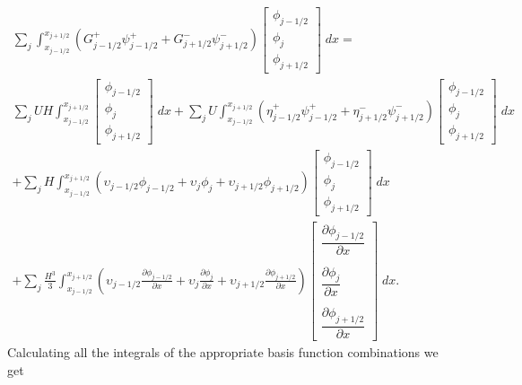 \begin{multline*}
\sum_j \int_{x_{j-1/2}}^{x_{j + 1/2}} \left(G^+_{j-1/2}\psi^+_{j - 1/2} + G^-_{j+1/2}\psi^-_{j + 1/2}\right) \begin{bmatrix}
\phi_{j-1/2}\\\phi_j \\\phi_{j+1/2}
\end{bmatrix}  \; dx =  \\ \sum_j UH\int_{x_{j-1/2}}^{x_{j + 1/2}}  \begin{bmatrix}
\phi_{j-1/2}\\\phi_j \\\phi_{j+1/2}
\end{bmatrix}  \; dx + \sum_j U\int_{x_{j-1/2}}^{x_{j + 1/2}} \left(\eta^+_{j-1/2}\psi^+_{j - 1/2} + \eta^-_{j+1/2}\psi^-_{j + 1/2}\right) \begin{bmatrix}
\phi_{j-1/2}\\\phi_j \\\phi_{j+1/2}
\end{bmatrix}  \; dx \\   +\sum_j H\int_{x_{j-1/2}}^{x_{j + 1/2}} \left(\upsilon_{j-1/2}\phi_{j - 1/2} + \upsilon_{j}\phi_{j}+ \upsilon_{j+1/2}\phi_{j + 1/2}\right) \begin{bmatrix}
\phi_{j-1/2}\\\phi_j \\\phi_{j+1/2}
\end{bmatrix}  \; dx \\ + 
\sum_j \frac{H^3}{3}\int_{x_{j-1/2}}^{x_{j + 1/2}} \left(\upsilon_{j-1/2} \frac{\partial \phi_{j - 1/2} }{\partial x} + \upsilon_{j}\frac{\partial \phi_{j} }{\partial x}+ \upsilon_{j+1/2}\frac{\partial \phi_{j + 1/2} }{\partial x}\right) \begin{bmatrix}
\dfrac{\partial \phi_{j - 1/2} }{\partial x}\\ \\\dfrac{\partial \phi_{j} }{\partial x}\\ \\\dfrac{\partial \phi_{j + 1/2} }{\partial x}   \end{bmatrix} \; dx.
\end{multline*}
Calculating all the integrals of the appropriate basis function combinations we get 
